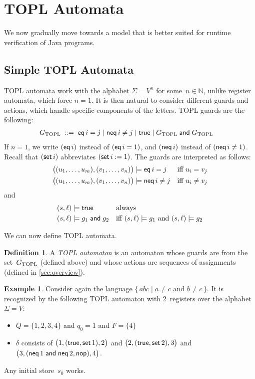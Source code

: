\documentclass[9pt, preprint]{sigplanconf} %
\newcommand{\N}{\ensuremath{\mathbb{N}}}
\theoremstyle{definition}
\newtheorem{definition}{Definition}
\newtheorem{example}{Example}
\theoremstyle{remark}
\begin{document}
\section{TOPL Automata}\label{sec:topl_automata} %

We now gradually move towards a model that is better suited for runtime verification of Java programs.

\subsection{Simple TOPL Automata} %

TOPL automata work with the alphabet $\Sigma=V^n$ for some~$n\in\N$, unlike register automata, which force $n=1$.
It is then natural to consider different guards and actions, which handle specific components of the letters.
TOPL guards are the following:
\begin{align*}
G_{\rm TOPL} &\;::=\; {\sf eq}\,i=j \mid 
{\sf neq}\,i\ne j \mid
 {\sf true} \mid 
G_{\rm TOPL} \mathrel{\sf and} G_{\rm TOPL}
\end{align*}
If $n=1$, we write $({\sf eq}\,i)$ instead of $({\sf eq}\,i=1)$, and $({\sf neq}\,i)$ instead of $({\sf neq}\,i\ne1)$.
Recall that $({\sf set}\,i)$ abbreviates $({\sf set}\,i:=1)$.
The guards are interpreted as follows:
\begin{align*}
\bigl((u_1,\ldots,u_m),(v_1,\ldots,v_n)\bigr) &\models {\sf eq}\,i=j
  &&\text{iff $u_i=v_j$} \\
\bigl((u_1,\ldots,u_m),(v_1,\ldots,v_n)\bigr) &\models {\sf neq}\,i\ne j
  &&\text{iff $u_i\ne v_j$}
\end{align*}
and
\begin{align*}
(s,\ell) &\models {\sf true}
  &&\text{always} \\
(s,\ell) &\models g_1\mathrel{\sf and} g_2
  &&\text{iff $(s,\ell)\models g_1$ and $(s,\ell)\models g_2$}
\end{align*}

We can now define TOPL automata.

\begin{definition}
A \emph{TOPL automaton} is an automaton whose guards are from the set~$G_{\rm TOPL}$ (defined above) and whose actions are sequences of assignments (defined in \autoref{sec:overview}).
\end{definition}

\begin{example}\label{ex:topl1}
Consider again the language $\{\,abc\mid\text{$a\ne c$ and $b\ne c$}\,\}$.
It is recognized by the following TOPL automaton with $2$~registers over the alphabet $\Sigma=V$:
\begin{itemize}
\item $Q=\{1,2,3,4\}$ and $q_0=1$ and $F=\{4\}$
\item $\delta$ consists of
  $\bigl(1,({\sf true}, {\sf set}\,1),2\bigr)$
  and $\bigl(2,({\sf true}, {\sf set}\,2),3\bigr)$
  and $\bigl(3,({\sf neq}\,1\mathrel{\sf and}{\sf neq}\,2, {\sf nop}),4\bigr)$.
\end{itemize}
Any initial store~$s_0$ works.
\end{example}
\end{document}
